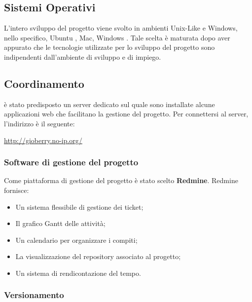 \subsection{Sistemi Operativi}

L’intero sviluppo del progetto viene svolto in ambienti Unix-Like e Windows, nello specifico, Ubuntu , Mac, Windows . Tale scelta è maturata dopo aver appurato che le tecnologie utilizzate per lo sviluppo del progetto sono indipendenti dall’ambiente di sviluppo e di impiego.

\subsection{Coordinamento}

è stato predisposto un server dedicato sul quale sono installate alcune applicazioni web
che facilitano la gestione del progetto. Per connettersi al server, l'indirizzo è il seguente:\\
\begin{center}
\url{http://gioberry.no-ip.org/}
\end{center}
\subsubsection{Software di gestione del progetto} 
\label{subsec:Software di gestione del prodotto}
Come piattaforma di gestione del progetto è stato scelto \textbf{Redmine}. Redmine fornisce:
\begin{itemize}
\item Un sistema flessibile di gestione dei ticket;
\item Il grafico Gantt delle attività;
\item Un calendario per organizzare i compiti;
\item La visualizzazione del repository associato al progetto;
\item Un sistema di rendicontazione del tempo.
\end{itemize}


\subsubsection{Versionamento}


